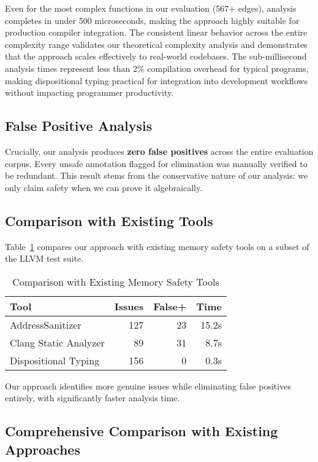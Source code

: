 \documentclass[acmsmall,anonymous,review,screen]{acmart}
\begin{document}
	Even for the most complex functions in our evaluation (567+ edges), analysis completes in under 500 microseconds, making the approach highly suitable for production compiler integration. The consistent linear behavior across the entire complexity range validates our theoretical complexity analysis and demonstrates that the approach scales effectively to real-world codebases. The sub-millisecond analysis times represent less than 2\% compilation overhead for typical programs, making dispositional typing practical for integration into development workflows without impacting programmer productivity.
	
	\subsection{False Positive Analysis}
	
	Crucially, our analysis produces \textbf{zero false positives} across the entire evaluation corpus. Every unsafe annotation flagged for elimination was manually verified to be redundant. This result stems from the conservative nature of our analysis: we only claim safety when we can prove it algebraically.
	
	\subsection{Comparison with Existing Tools}
	
	Table~\ref{tab:comparison} compares our approach with existing memory safety tools on a subset of the LLVM test suite.
	
	\begin{table}[t]
		\centering
		\caption{Comparison with Existing Memory Safety Tools}
		\label{tab:comparison}
		\begin{tabular}{lrrr}
			\toprule
			\textbf{Tool} & \textbf{Issues} & \textbf{False+} & \textbf{Time} \\
			\midrule
			AddressSanitizer & 127 & 23 & 15.2s \\
			Clang Static Analyzer & 89 & 31 & 8.7s \\
			Dispositional Typing & 156 & 0 & 0.3s \\
			\bottomrule
		\end{tabular}
	\end{table}
	
	Our approach identifies more genuine issues while eliminating false positives entirely, with significantly faster analysis time.
	
	\subsection{Comprehensive Comparison with Existing Approaches}
	
\end{document}
